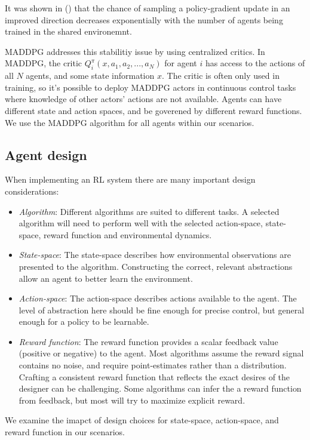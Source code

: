 \documentclass[11pt,a4paper]{article}
\begin{document}
It was shown in () that the chance of sampling a policy-gradient update in an improved direction decreases exponentially with the number of agents being trained in the shared environemnt.

MADDPG addresses this stabilitiy issue by using centralized critics.
In MADDPG, the critic $Q^\pi_i(x, a_1, a_2, ..., a_N)$ for agent $i$ has access to the actions of all $N$ agents, and some state information $x$.
The critic is often only used in training, so it's possible to deploy MADDPG actors in continuous control tasks where knowledge of other actors' actions are not available.
Agents can have different state and action spaces, and be goverened by different reward functions.
We use the MADDPG algorithm for all agents within our scenarios.

\subsection{Agent design}

When implementing an RL system there are many important design considerations:

\begin{itemize}
  \item \emph{Algorithm}: Different algorithms are suited to different tasks. A selected algorithm will need to perform well with the selected action-space, state-space, reward function and environmental dynamics.
  \item \emph{State-space}: The state-space describes how environmental observations are presented to the algorithm. Constructing the correct, relevant abstractions allow an agent to better learn the environment.
  \item \emph{Action-space}: The action-space describes actions available to the agent. The level of abstraction here should be fine enough for precise control, but general enough for a policy to be learnable.
  \item \emph{Reward function}: The reward function provides a scalar feedback value (positive or negative) to the agent. Most algorithms assume the reward signal contains no noise, and require point-estimates rather than a distribution. Crafting a consistent reward function that reflects the exact desires of the designer can be challenging. Some algorithms can infer the a reward function from feedback, but most will try to maximize explicit reward.
\end{itemize}

We examine the imapct of design choices for state-space, action-space, and reward function in our scenarios.
\end{document}
